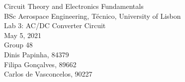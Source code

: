 
\thispagestyle {empty}


\begin{center}
%
\vspace{1.0cm}

\vspace{1cm}
{\FontLb Circuit Theory and Electronics Fundamentals} \\ %
\vspace{1cm}
{\FontSn BSc Aerospace Engineering, Técnico, University of Lisbon} \\ %
\vspace{1cm}
{\FontSn Lab 3: AC/DC Converter Circuit} \\
\vspace{1cm}
{\FontSn May 5, 2021} \\ %
\vspace{1cm}
{\FontSn Group 48} \\ %
{\FontSn Dinis Papinha, 84379} \\ %
{\FontSn Filipa Gonçalves, 89662} \\ %
{\FontSn Carlos de Vasconcelos, 90227} \\ %
%
\end{center}
